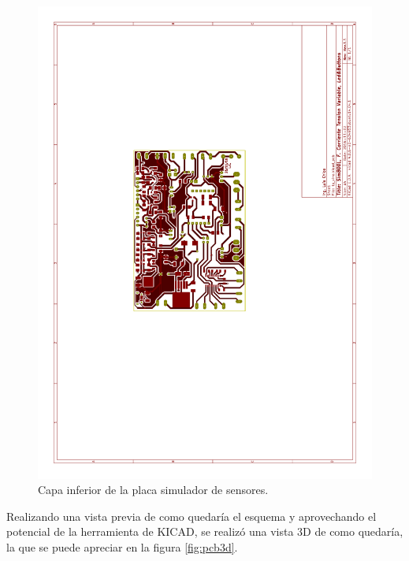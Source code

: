 \begin{figure}[!htb]
  \centering
  \includegraphics[page=2,angle=270,clip,trim=5.5cm 10cm 7.7cm 8.5cm]{./Figures/pcb_layer.pdf}
  \caption{Capa inferior de la placa simulador de sensores.}
  \label{fig:layer_inf}
\end{figure}

Realizando una vista previa de como quedaría el esquema y aprovechando el potencial de la herramienta de KICAD, se realizó una vista 3D de como quedaría, la que se puede apreciar en la figura \ref{fig:pcb3d}.

